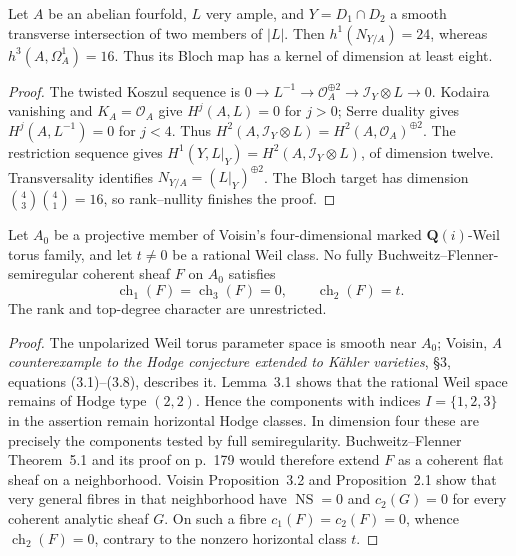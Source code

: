 \begin{proposition}
\label{prop:semireg-ci-counterexample}
Let $A$ be an abelian fourfold, $L$ very ample, and
$Y=D_1\cap D_2$ a smooth transverse intersection of two members
of $|L|$. Then $h^1(N_{Y/A})=24$, whereas
$h^3(A,\Omega_A^1)=16$. Thus its Bloch map has a kernel of
dimension at least eight.
\end{proposition}
\begin{proof}
The twisted Koszul sequence is
$0\to L^{-1}\to\mathcal O_A^{\oplus2}\to\mathcal I_Y\otimes L\to0$.
Kodaira vanishing and $K_A=\mathcal O_A$ give $H^j(A,L)=0$ for
$j>0$; Serre duality gives $H^j(A,L^{-1})=0$ for $j<4$.
Thus
$H^2(A,\mathcal I_Y\otimes L)=H^2(A,\mathcal O_A)^{\oplus2}$.
The restriction sequence gives
$H^1(Y,L|_Y)=H^2(A,\mathcal I_Y\otimes L)$, of dimension twelve.
Transversality identifies $N_{Y/A}=(L|_Y)^{\oplus2}$.
The Bloch target has dimension
$\binom43\binom41=16$, so rank--nullity finishes the proof.
\end{proof}

\begin{proposition}
\label{prop:semireg-pure-weil-no-go}
Let $A_0$ be a projective member of Voisin's four-dimensional
marked $\mathbf Q(i)$-Weil torus family, and let $t\ne0$ be a
rational Weil class. No fully Buchweitz--Flenner-semiregular
coherent sheaf $F$ on $A_0$ satisfies
\[
 \operatorname{ch}_1(F)=\operatorname{ch}_3(F)=0,\qquad
 \operatorname{ch}_2(F)=t.
\]
The rank and top-degree character are unrestricted.
\end{proposition}
\begin{proof}
The unpolarized Weil torus parameter space is smooth near $A_0$;
Voisin, \emph{A counterexample to the Hodge conjecture extended
to K\"ahler varieties}, \S3, equations (3.1)--(3.8), describes it.
Lemma~3.1 shows that the rational Weil space remains of Hodge
type $(2,2)$. Hence the components with indices $I=\{1,2,3\}$
in the assertion remain horizontal Hodge classes. In dimension
four these are precisely the components tested by full
semiregularity.
Buchweitz--Flenner Theorem~5.1 and its proof on p.~179 would
therefore extend $F$ as a coherent flat sheaf on a neighborhood.
Voisin Proposition~3.2 and Proposition~2.1 show that very general
fibres in that neighborhood have $\operatorname{NS}=0$ and
$c_2(G)=0$ for every coherent analytic sheaf $G$.
On such a fibre $c_1(F)=c_2(F)=0$, whence
$\operatorname{ch}_2(F)=0$, contrary to the nonzero horizontal
class $t$.
\end{proof}

